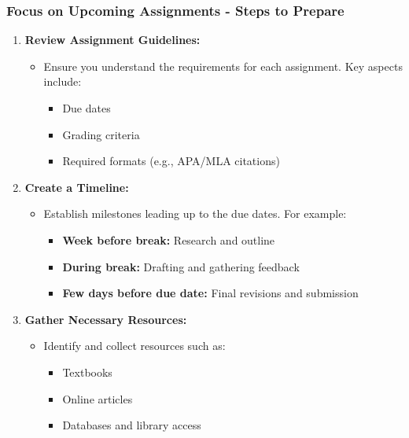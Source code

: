 \documentclass[aspectratio=169]{beamer}
\begin{document}
\begin{frame}[fragile]
    \frametitle{Focus on Upcoming Assignments - Steps to Prepare}
    \begin{enumerate}
        \item \textbf{Review Assignment Guidelines:}
            \begin{itemize}
                \item Ensure you understand the requirements for each assignment. Key aspects include:
                \begin{itemize}
                    \item Due dates
                    \item Grading criteria
                    \item Required formats (e.g., APA/MLA citations)
                \end{itemize}
            \end{itemize}
        \item \textbf{Create a Timeline:}
            \begin{itemize}
                \item Establish milestones leading up to the due dates. For example:
                \begin{itemize}
                    \item \textbf{Week before break:} Research and outline
                    \item \textbf{During break:} Drafting and gathering feedback
                    \item \textbf{Few days before due date:} Final revisions and submission
                \end{itemize}
            \end{itemize}
        \item \textbf{Gather Necessary Resources:}
            \begin{itemize}
                \item Identify and collect resources such as:
                \begin{itemize}
                    \item Textbooks
                    \item Online articles
                    \item Databases and library access
                \end{itemize}
            \end{itemize}
    \end{enumerate}
\end{frame}
\end{document}
